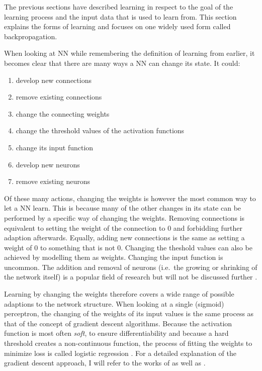 The previous sections have described learning in respect to the goal of the learning process and the input data that is
used to learn from. This section explains the forms of learning and focuses on one widely used form called
backpropagation.

When looking at \ac{NN} while remembering the definition of learning from earlier, it becomes clear that there are many
ways a \ac{NN} can change its state. It could:

\begin{enumerate}
    \item develop new connections
    \item remove existing connections
    \item change the connecting weights
    \item change the threshold values of the activation functions
    \item change its input function
    \item develop new neurons
    \item remove existing neurons \cite[p.60]{kriesel2007brief}
\end{enumerate}

Of these many actions, changing the weights is however the most common way to let a \ac{NN} learn. This is because many
of the other changes in its state can be performed by a specific way of changing the weights. Removing connections is
equivalent to setting the weight of the connection to 0 and forbidding further adaption afterwards. Equally, adding new
connections is the same as setting a weight of 0 to something that is not 0. Changing the theshold values can also be
achieved by modelling them as weights. Changing the input function is uncommon. The addition and removal of neurons
(i.e.\ the growing or shrinking of the network itself) is a popular field of research but will not be discussed further
\cite[p.60]{kriesel2007brief}.

Learning by changing the weights therefore covers a wide range of possible adaptions to the network structure. When
looking at a single (sigmoid) perceptron, the changing of the weights of its input values is the same process as that of the
concept of gradient descent algorithms. Because the activation function is most often \emph{soft}, to ensure
differentiability and because a hard threshold creates a non-continuous function, the process of fitting the weights to
minimize loss is called logistic regression \cite[p.729f.]{russell2016artificial}. For a detailed explanation of the gradient
descent approach, I will refer to the works of \citet{russell2016artificial} as well as
\citet{Goodfellow-et-al-2016}.



